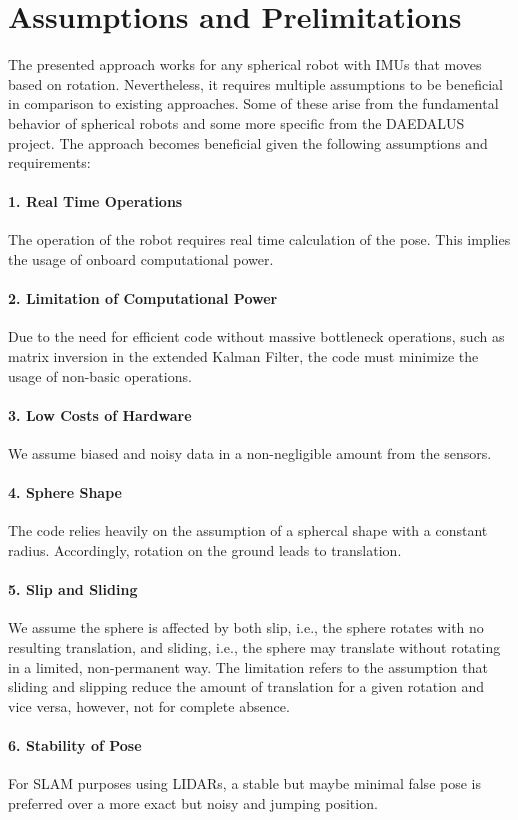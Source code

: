 \documentclass[letterpaper, 10 pt, conference]{ieeeconf}  %
\begin{document}
\section{Assumptions and Prelimitations}
\label{sec:AssumptionsAndPrelimitations}
The presented approach works for any spherical robot with IMUs that moves based on rotation.
Nevertheless, it requires multiple assumptions to be beneficial in comparison to existing approaches.
Some of these arise from the fundamental behavior of spherical robots and some more specific from the DAEDALUS project.
The approach becomes beneficial given the following assumptions and requirements:

\paragraph*{1. Real Time Operations}The operation of the robot requires real time calculation of the pose. This implies the usage of onboard computational power.
\paragraph*{2. Limitation of Computational Power}
Due to the need for efficient code without massive bottleneck operations, such as matrix inversion in the extended Kalman Filter, the code must minimize the usage of non-basic operations.
\paragraph*{3. Low Costs of Hardware}
We assume biased and noisy data in a non-negligible amount from the sensors.
\paragraph*{4. Sphere Shape}
The code relies heavily on the assumption of a sphercal shape with a constant radius. Accordingly, rotation on the ground leads to translation.
\paragraph*{5. Slip and Sliding}
We assume the sphere is affected by both slip, i.e., the sphere rotates with no resulting translation, and sliding, i.e., the sphere may translate without rotating in a limited, non-permanent way. The limitation refers to the assumption that sliding and slipping reduce the amount of translation for a given rotation and vice versa, however, not for complete absence.
\paragraph*{6. Stability of Pose}
For SLAM purposes using LIDARs, a stable but maybe minimal false pose is preferred over a more exact but noisy and jumping position.
\end{document}
